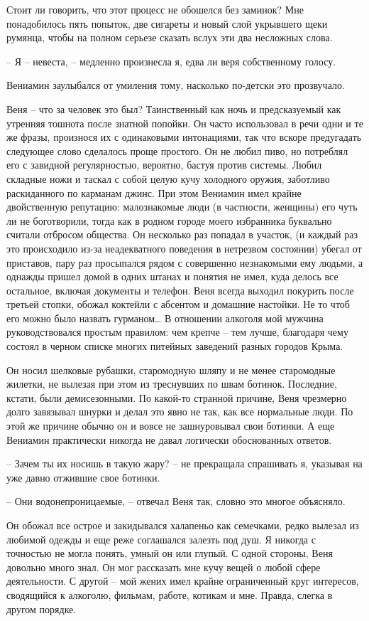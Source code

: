 \documentclass[
]{book}
\begin{document}
Стоит ли говорить, что этот процесс не обошелся без заминок? Мне понадобилось пять попыток, две сигареты и новый слой укрывшего щеки румянца, чтобы на полном серьезе сказать вслух эти два несложных слова.

-- Я -- невеста, -- медленно произнесла я, едва ли веря собственному голосу.

Вениамин заулыбался от умиления тому, насколько по-детски это прозвучало.

Веня -- что за человек это был? Таинственный как ночь и предсказуемый как утренняя тошнота после знатной попойки. Он часто использовал в речи одни и те же фразы, произнося их с одинаковыми интонациями, так что вскоре предугадать следующее слово сделалось проще простого. Он не любил пиво, но потреблял его с завидной регулярностью, вероятно, бастуя против системы. Любил складные ножи и таскал с собой целую кучу холодного оружия, заботливо раскиданного по карманам джинс. При этом Вениамин имел крайне двойственную репутацию: малознакомые люди (в частности, женщины) его чуть ли не боготворили, тогда как в родном городе моего избранника буквально считали отбросом общества. Он несколько раз попадал в участок, (и каждый раз это происходило из-за неадекватного поведения в нетрезвом состоянии) убегал от приставов, пару раз просыпался рядом с совершенно незнакомыми ему людьми, а однажды пришел домой в одних штанах и понятия не имел, куда делось все остальное, включая документы и телефон. Веня всегда выходил покурить после третьей стопки, обожал коктейли с абсентом и домашние настойки. Не то чтоб его можно было назвать гурманом\ldots{} В отношении алкоголя мой мужчина руководствовался простым правилом: чем крепче -- тем лучше, благодаря чему состоял в черном списке многих питейных заведений разных городов Крыма.

Он носил шелковые рубашки, старомодную шляпу и не менее старомодные жилетки, не вылезая при этом из треснувших по швам ботинок. Последние, кстати, были демисезонными. По какой-то странной причине, Веня чрезмерно долго завязывал шнурки и делал это явно не так, как все нормальные люди. По этой же причине обычно он и вовсе не зашнуровывал свои ботинки. А еще Вениамин практически никогда не давал логически обоснованных ответов.

-- Зачем ты их носишь в такую жару? -- не прекращала спрашивать я, указывая на уже давно отжившие свое ботинки.

-- Они водонепроницаемые, -- отвечал Веня так, словно это многое объясняло.

Он обожал все острое и закидывался халапеньо как семечками, редко вылезал из любимой одежды и еще реже соглашался залезть под душ. Я никогда с точностью не могла понять, умный он или глупый. С одной стороны, Веня довольно много знал. Он мог рассказать мне кучу вещей о любой сфере деятельности. С другой -- мой жених имел крайне ограниченный круг интересов, сводящийся к алкоголю, фильмам, работе, котикам и мне. Правда, слегка в другом порядке.
\end{document}
